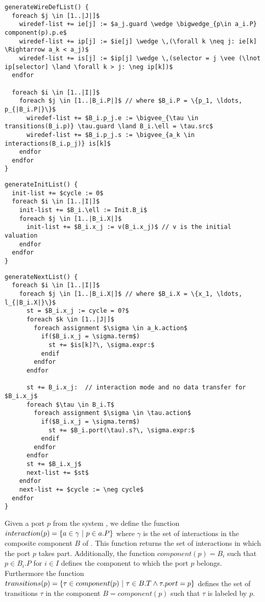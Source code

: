 \begin{lstlisting}
generateWireDefList() {
  foreach $j \in [1..|J|]$
    wiredef-list += ie[j] := $a_j.guard \wedge \bigwedge_{p\in a_i.P} component(p).p.e$ 
    wiredef-list += ip[j] := $ie[j] \wedge \,(\forall k \neq j: ie[k] \Rightarrow a_k < a_j)$ 
    wiredef-list += is[j] := $ip[j] \wedge \,(selector = j \vee (\lnot ip[selector] \land \forall k > j: \neg ip[k])$   
  endfor

  foreach $i \in [1..|I|]$
    foreach $j \in [1..|B_i.P|]$ // where $B_i.P = \{p_1, \ldots, p_{|B_i.P|}\}$ 
      wiredef-list += $B_i.p_j.e := \bigvee_{\tau \in transitions(B_i.p)} \tau.guard \land B_i.\ell = \tau.src$
      wiredef-list += $B_i.p_j.s := \bigvee_{a_k \in interactions(B_i.p_j)} is[k]$
    endfor
  endfor
} 
\end{lstlisting}

\begin{lstlisting}
generateInitList() {
  init-list += $cycle := 0$
  foreach $i \in [1..|I|]$
    init-list += $B_i.\ell := Init.B_i$
    foreach $j \in [1..|B_i.X|]$
      init-list += $B_i.x_j := v(B_i.x_j)$ // v is the initial valuation
    endfor
  endfor
}
\end{lstlisting}

\begin{lstlisting}
generateNextList() {
  foreach $i \in [1..|I|]$
    foreach $j \in [1..|B_i.X|]$ // where $B_i.X = \{x_1, \ldots, l_{|B_i.X|}\}$ 
      st = $B_i.x_j := cycle = 0?$
      foreach $k \in [1..|J|]$
        foreach assignment $\sigma \in a_k.action$
          if($B_i.x_j = \sigma.term$)
            st += $is[k]?\, \sigma.expr:$
          endif
        endfor
      endfor
    
      st += B_i.x_j:  // interaction mode and no data transfer for $B_i.x_j$
      foreach $\tau \in B_i.T$ 
        foreach assignment $\sigma \in \tau.action$
          if($B_i.x_j = \sigma.term$)
            st += $B_i.port(\tau).s?\, \sigma.expr:$
          endif
        endfor
      endfor      
      st += $B_i.x_j$
      next-list += $st$
    endfor
    next-list += $cycle := \neg cycle$
  endfor
}
\end{lstlisting}


Given a port $p$ from the system \Pm, we define the function
$interaction(p) = \{ a \in \gamma~|~p \in a.P \}$ where $\gamma$
is the set of interactions in the composite component $B$ of \Pm.
This function returns the set of interactions in which the port 
$p$ takes part. Additionally, the function 
$component(p) = B_i$ such that $p \in B_i.P$ for $i \in I$ defines
the component to which the port $p$ belongs. Furthermore the function
$transitions(p) = \{ \tau \in component(p)~|~\tau \in B.T \land \tau.port = p \}$ defines the 
set of transitions $\tau$ in the component $B = component(p)$ such that $\tau$ 
is labeled by $p$. 

